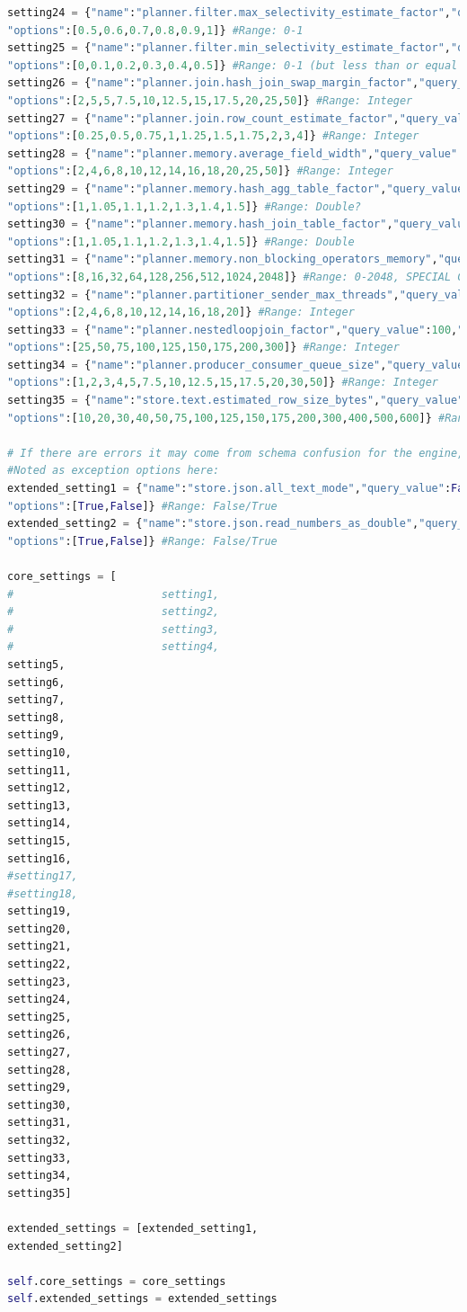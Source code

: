\documentclass[a4paper,english]{report}
\begin{document}
\begin{lstlisting}[language=Python, caption=class\_definition.py\, the file defining all the algorithmic operations done during a optimization process.]
setting24 = {"name":"planner.filter.max_selectivity_estimate_factor","query_value":1,"type":"double",
"options":[0.5,0.6,0.7,0.8,0.9,1]} #Range: 0-1
setting25 = {"name":"planner.filter.min_selectivity_estimate_factor","query_value":0,"type":"double",
"options":[0,0.1,0.2,0.3,0.4,0.5]} #Range: 0-1 (but less than or equal to max)
setting26 = {"name":"planner.join.hash_join_swap_margin_factor","query_value":10,"type":"double",
"options":[2,5,5,7.5,10,12.5,15,17.5,20,25,50]} #Range: Integer
setting27 = {"name":"planner.join.row_count_estimate_factor","query_value":1,"type":"double",
"options":[0.25,0.5,0.75,1,1.25,1.5,1.75,2,3,4]} #Range: Integer
setting28 = {"name":"planner.memory.average_field_width","query_value":8,"type":"integer",
"options":[2,4,6,8,10,12,14,16,18,20,25,50]} #Range: Integer
setting29 = {"name":"planner.memory.hash_agg_table_factor","query_value":1.1,"type":"double",
"options":[1,1.05,1.1,1.2,1.3,1.4,1.5]} #Range: Double?
setting30 = {"name":"planner.memory.hash_join_table_factor","query_value":1.1,"type":"double",
"options":[1,1.05,1.1,1.2,1.3,1.4,1.5]} #Range: Double
setting31 = {"name":"planner.memory.non_blocking_operators_memory","query_value":64,"type":"integer",
"options":[8,16,32,64,128,256,512,1024,2048]} #Range: 0-2048, SPECIAL CASE, NEEDS TO BE A POWER OF 2
setting32 = {"name":"planner.partitioner_sender_max_threads","query_value":8,"type":"integer",
"options":[2,4,6,8,10,12,14,16,18,20]} #Range: Integer
setting33 = {"name":"planner.nestedloopjoin_factor","query_value":100,"type":"double",
"options":[25,50,75,100,125,150,175,200,300]} #Range: Integer
setting34 = {"name":"planner.producer_consumer_queue_size","query_value":10,"type":"integer",
"options":[1,2,3,4,5,7.5,10,12.5,15,17.5,20,30,50]} #Range: Integer
setting35 = {"name":"store.text.estimated_row_size_bytes","query_value":100,"type":"double",
"options":[10,20,30,40,50,75,100,125,150,175,200,300,400,500,600]} #Range: Integer

# If there are errors it may come from schema confusion for the engine, solution are usually these
#Noted as exception options here:
extended_setting1 = {"name":"store.json.all_text_mode","query_value":False,"type":"boolean",
"options":[True,False]} #Range: False/True
extended_setting2 = {"name":"store.json.read_numbers_as_double","query_value":False,"type":"boolean",
"options":[True,False]} #Range: False/True

core_settings = [
#						setting1,
#						setting2,
#						setting3,
#						setting4,
setting5,
setting6,
setting7,
setting8,
setting9,
setting10,
setting11,
setting12,
setting13,
setting14,
setting15,
setting16,
#setting17,
#setting18,
setting19,
setting20,
setting21,
setting22,
setting23,
setting24,
setting25,
setting26,
setting27,
setting28,
setting29,
setting30,
setting31,
setting32,
setting33,
setting34,
setting35]

extended_settings = [extended_setting1,
extended_setting2]

self.core_settings = core_settings
self.extended_settings = extended_settings
\end{lstlisting}
\end{document}
